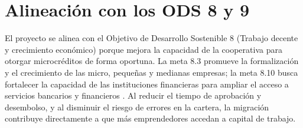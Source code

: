\begin{table}[H]
  \centering
  \caption{Componentes de la solución propuesta}
  \label{tab:solucion-componentes}
\end{table}

\section{Alineación con los ODS 8 y 9}

El proyecto se alinea con el Objetivo de Desarrollo Sostenible 8 (Trabajo
decente y crecimiento económico) porque mejora la capacidad de la cooperativa
para otorgar microcréditos de forma oportuna. La meta 8.3 promueve la
formalización y el crecimiento de las micro, pequeñas y medianas empresas; la
meta 8.10 busca fortalecer la capacidad de las instituciones financieras para
ampliar el acceso a servicios bancarios y financieros \citep{un2023ods8}. Al
reducir el tiempo de aprobación y desembolso, y al disminuir el riesgo de
errores en la cartera, la migración contribuye directamente a que más
emprendedores accedan a capital de trabajo.

